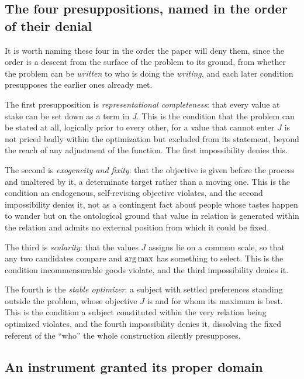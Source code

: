 \subsection*{The four presuppositions, named in the order of their denial}

It is worth naming these four in the order the paper will deny them, since the order is a descent from the surface of the problem to its ground, from whether the problem can be \emph{written} to who is doing the \emph{writing}, and each later condition presupposes the earlier ones already met.

The first presupposition is \emph{representational completeness}: that every value at stake can be set down as a term in $J$. This is the condition that the problem can be stated at all, logically prior to every other, for a value that cannot enter $J$ is not priced badly within the optimization but excluded from its statement, beyond the reach of any adjustment of the function. The first impossibility denies this.

The second is \emph{exogeneity and fixity}: that the objective is given before the process and unaltered by it, a determinate target rather than a moving one. This is the condition an endogenous, self-revising objective violates, and the second impossibility denies it, not as a contingent fact about people whose tastes happen to wander but on the ontological ground that value in relation is generated within the relation and admits no external position from which it could be fixed.

The third is \emph{scalarity}: that the values $J$ assigns lie on a common scale, so that any two candidates compare and $\operatorname*{arg\,max}$ has something to select. This is the condition incommensurable goods violate, and the third impossibility denies it.

The fourth is the \emph{stable optimizer}: a subject with settled preferences standing outside the problem, whose objective $J$ is and for whom its maximum is best. This is the condition a subject constituted within the very relation being optimized violates, and the fourth impossibility denies it, dissolving the fixed referent of the ``who'' the whole construction silently presupposes.

\subsection*{An instrument granted its proper domain}

